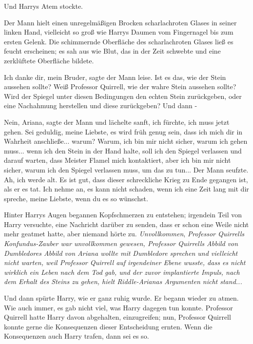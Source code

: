 Und Harrys Atem stockte.

Der Mann hielt einen unregelmäßigen Brocken scharlachroten Glases in seiner
linken Hand, vielleicht so groß wie Harrys Daumen vom Fingernagel bis zum ersten
Gelenk. Die schimmernde Oberfläche des scharlachroten Glases ließ es feucht
erscheinen; es sah aus wie Blut, das in der Zeit schwebte und eine zerklüftete
Oberfläche bildete.

\glqq{}Ich danke dir, mein Bruder\grqq{}, sagte der Mann leise. Ist es das, wie
der Stein aussehen sollte? Weiß Professor Quirrell, wie der wahre Stein aussehen
sollte? Wird der Spiegel unter diesen Bedingungen den echten Stein zurückgeben,
oder eine Nachahmung herstellen und diese zurückgeben? Und dann -

\glqq{}Nein, Ariana\grqq{}, sagte der Mann und lächelte sanft, \glqq{}ich fürchte,
ich muss jetzt gehen. Sei geduldig, meine Liebste, es wird früh genug sein, dass
ich mich dir in Wahrheit anschließe... warum? Warum, ich bin mir nicht sicher,
warum ich gehen muss... wenn ich den Stein in der Hand halte, soll ich den
Spiegel verlassen und darauf warten, dass Meister Flamel mich kontaktiert, aber
ich bin mir nicht sicher, warum ich den Spiegel verlassen muss, um das zu
tun...\grqq{} Der Mann seufzte. \glqq{}Ah, ich werde alt. Es ist gut, dass dieser
schreckliche Krieg zu Ende gegangen ist, als er es tat. Ich nehme an, es kann
nicht schaden, wenn ich eine Zeit lang mit dir spreche, meine Liebste, wenn du
es so wünschst.\grqq{}

Hinter Harrys Augen begannen Kopfschmerzen zu entstehen; irgendein Teil von
Harry versuchte, eine Nachricht darüber zu senden, dass er schon eine Weile
nicht mehr geatmet hatte, aber niemand hörte zu. \emph{Unvollkommen},
\emph{Professor Quirrells Konfundus-Zauber war unvollkommen gewesen, Professor
Quirrells Abbild von Dumbledores Abbild von Ariana wollte mit Dumbledore
sprechen und vielleicht nicht warten, weil Professor Quirrell auf irgendeiner
Ebene wusste, dass es nicht wirklich ein Leben nach dem Tod gab, und der zuvor
implantierte Impuls, nach dem Erhalt des Steins zu gehen, hielt Riddle-Arianas
Argumenten nicht stand...}

Und dann spürte Harry, wie er ganz ruhig wurde. Er begann wieder zu atmen. Wie
auch immer, es gab nicht viel, was Harry dagegen tun konnte. Professor Quirrell
hatte Harry davon abgehalten, einzugreifen; nun, Professor Quirrell konnte gerne
die Konsequenzen dieser Entscheidung ernten. Wenn die Konsequenzen auch Harry
trafen, dann sei es so.

